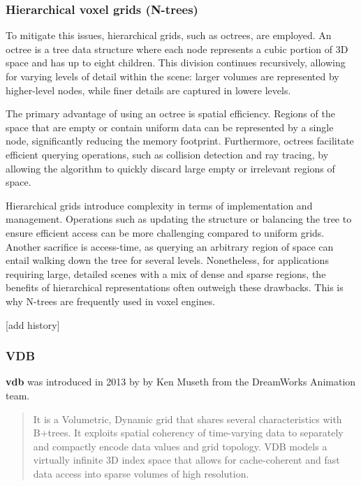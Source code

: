 \subsubsection{Hierarchical voxel grids (N-trees)}
To mitigate this issues, hierarchical grids, such as octrees, are employed. An octree is a tree data structure where each node represents a cubic portion of 3D space and has up to eight children. This division continues recursively, allowing for varying levels of detail within the scene: larger volumes are represented by higher-level nodes, while finer details are captured in lowere levels.

The primary advantage of using an octree is spatial efficiency. Regions of the space that are empty or contain uniform data can be represented by a single node, significantly reducing the memory footprint. Furthermore, octrees facilitate efficient querying operations, such as collision detection and ray tracing, by allowing the algorithm to quickly discard large empty or irrelevant regions of space.

Hierarchical grids introduce complexity in terms of implementation and management. Operations such as updating the structure or balancing the tree to ensure efficient access can be more challenging compared to uniform grids.
Another sacrifice is access-time, as querying an arbitrary region of space can entail walking down the tree for several levels.
Nonetheless, for applications requiring large, detailed scenes with a mix of dense and sparse regions, the benefits of hierarchical representations often outweigh these drawbacks. This is why N-trees are frequently used in voxel engines.

[add history]

\subsubsection{VDB}

\textbf{\acrshort{vdb}} was introduced in 2013 by by Ken Museth\supercite{vdb2013} from the DreamWorks Animation team.
\begin{quote}
It is a Volumetric, Dynamic grid that shares several characteristics with B+trees.
It exploits spatial coherency of time-varying data to separately and compactly encode data values and grid topology.
VDB models a virtually infinite 3D index space that allows for cache-coherent and fast data access into sparse volumes of high resolution.
\end{quote}


